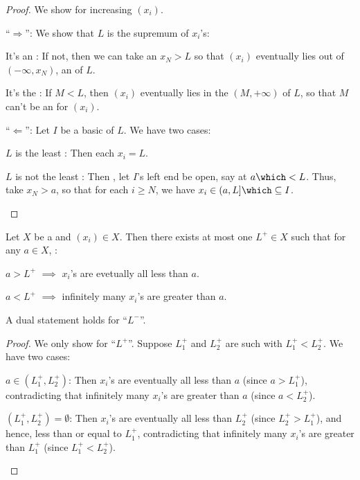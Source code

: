 	\begin{proof}
		We show for increasing $(x_i)$.
		
		``$\Rightarrow$'': We show that $L$ is the supremum of $x_i$'s:
		\begin{prooflist}
			\item It's an \ub: If not, then we can take an $x_N > L$ so that $(x_i)$ eventually lies out of $(-\infty, x_N)$, an \onbd of $L$.
			
			\item It's the \lub: If $M < L$, then $(x_i)$ eventually lies in the \onbd $(M, +\infty)$ of $L$, so that $M$ can't be an \ub for $(x_i)$.
		\end{prooflist}
		
		``$\Leftarrow$'': Let $I$ be a basic \onbd of $L$. We have two cases:
		\begin{mylist}
			\item $L$ is the least \elt: Then each $x_i = L$.
			\item $L$ is not the least \elt: Then \wlogg, let $I$'s left end be open, say at $a\which < L$. Thus, take $x_N > a$, so that for each $i\ge N$, we have $x_i\in (a, L]\which\subseteq I$.\qedhere
		\end{mylist}
	\end{proof}
	
	
	
	\begin{lem}
		Let $X$ be a \LOTS and $(x_i)\in X$. Then there exists at most one $L^+\in X$ such that for any $a\in X$, \tfh:
		\begin{mylist}
			\item $a > L^+$ $\implies$ $x_i$'s are evetually all less than $a$.
			\item $a < L^+$ $\implies$ infinitely many $x_i$'s are greater than $a$.
		\end{mylist}
		A dual statement holds for ``$L^-$''.
	\end{lem}
	
	\begin{proof}
		We only show for ``$L^+$''. Suppose $L^+_1$ and $L^+_2$ are such with $L^+_1 < L^+_2$. We have two cases:
		\begin{mylist}
			\item $a\in (L^+_1, L^+_2)$: Then $x_i$'s are eventually all less than $a$ (since $a > L^+_1$), contradicting that infinitely many $x_i$'s are greater than $a$ (since $a < L^+_2$).
			
			\item $(L^+_1, L^+_2) = \emptyset$: Then $x_i$'s are eventually all less than $L^+_2$ (since $L^+_2 > L^+_1$), and hence, less than or equal to $L^+_1$, contradicting that infinitely many $x_i$'s are greater than $L^+_1$ (since $L^+_1 < L^+_2$).
			\qedhere
		\end{mylist}
	\end{proof}
	
